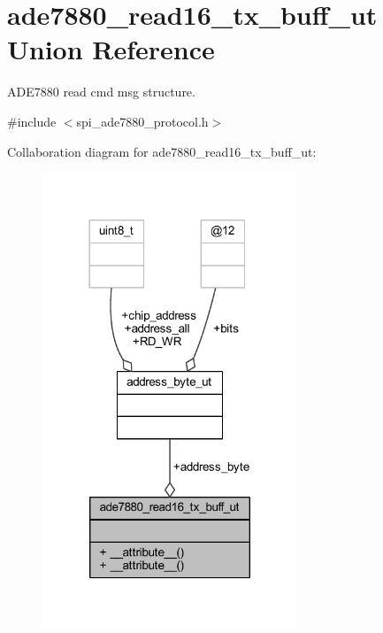 \hypertarget{a00013}{\section{ade7880\-\_\-read16\-\_\-tx\-\_\-buff\-\_\-ut Union Reference}
\label{d7/dd4/a00013}
}


A\-D\-E7880 read cmd msg structure.  




{\ttfamily \#include $<$spi\-\_\-ade7880\-\_\-protocol.\-h$>$}



Collaboration diagram for ade7880\-\_\-read16\-\_\-tx\-\_\-buff\-\_\-ut\-:\nopagebreak
\begin{figure}[H]
\begin{center}
\leavevmode
\includegraphics[width=216pt]{d1/d6f/a00063}
\end{center}
\end{figure}
